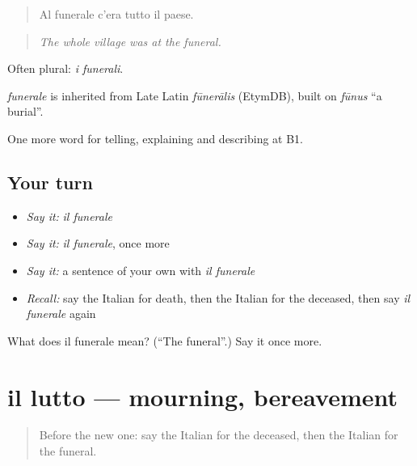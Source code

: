 \begin{quote}
Al funerale c'era tutto il paese.
\end{quote}

\begin{quote}
\emph{The whole village was at the funeral.}
\end{quote}

Often plural: \emph{i funerali}.

\begin{cousinweb}
\emph{funerale} is inherited from Late Latin \emph{fūnerālis} (EtymDB), built on \emph{fūnus} \textquotedblleft{}a burial\textquotedblright{}.
\end{cousinweb}

\begin{grammarlens}[title={What you've built}]
One more word for telling, explaining and describing at B1.
\end{grammarlens}

\subsection*{Your turn}
\begin{itemize}
\raggedright
  \item \emph{Say it:} \emph{il funerale}
  \item \emph{Say it:} \emph{il funerale}, once more
  \item \emph{Say it:} a sentence of your own with \emph{il funerale}
  \item \emph{Recall:} say the Italian for death, then the Italian for the deceased, then say \emph{il funerale} again
\end{itemize}

\begin{tcolorbox}[breakable,colback=teal!4,colframe=teal!35!black,title={Before you move on}]
What does il funerale mean? (\textquotedblleft{}The funeral\textquotedblright{}.) Say it once more.
\end{tcolorbox}
\section[il lutto]{il lutto — mourning, bereavement}

\label{lesson:IT-C313-lutto}



\begin{quote}
Before the new one: say the Italian for the deceased, then the Italian for the funeral.
\end{quote}

